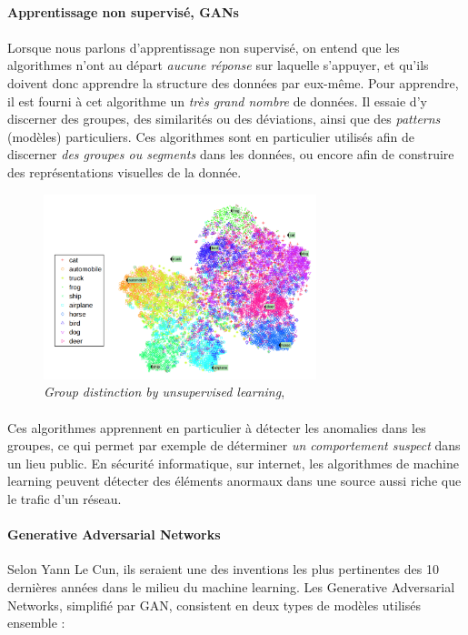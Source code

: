 \paragraph{Apprentissage non supervisé, GANs}

\paragraph{} Lorsque nous parlons d'apprentissage non supervisé, on entend que les algorithmes n'ont au départ \emph{aucune
réponse} sur laquelle s'appuyer, et qu'ils doivent donc apprendre la structure des données par eux-même. Pour apprendre, il
est fourni à cet algorithme un \emph{très grand nombre} de données. Il essaie d'y discerner des groupes, des similarités ou
des déviations, ainsi que des \emph{patterns} (modèles) particuliers. Ces algorithmes sont en particulier utilisés afin de
discerner \emph{des groupes ou segments} dans les données, ou encore afin de construire des représentations visuelles de la
donnée.

\begin{figure}[h]
    \centering
    \includegraphics[width=300px]{chapters/03/images/clustering.png}
    \caption{\label{clustering} \emph{Group distinction by unsupervised learning}, \cite{MachineLearning0}}
\end{figure}

\paragraph{} Ces algorithmes apprennent en particulier à détecter les anomalies dans les groupes, ce qui permet par 
exemple de déterminer \emph{un comportement suspect} dans un lieu public. En sécurité informatique, sur internet, 
les algorithmes de machine learning peuvent détecter des éléments anormaux dans une source aussi riche que le trafic
d'un réseau. 

\paragraph{Generative Adversarial Networks} Selon Yann Le Cun, ils seraient une des inventions les plus pertinentes
des 10 dernières années dans le milieu du machine learning. Les Generative Adversarial Networks, simplifié par GAN,
consistent en deux types de modèles utilisés ensemble :

